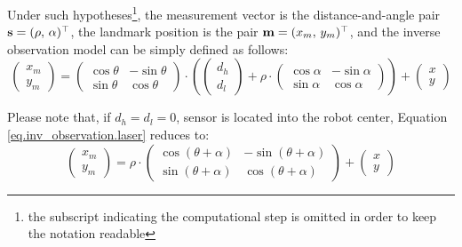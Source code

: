 		Under such hypotheses\footnote{\label{sec.models.subscript}the subscript indicating the computational step is omitted in order to keep the notation readable}, the measurement vector is the distance-and-angle pair $\boldsymbol{\mathrm{{s}}} = (\rho,\, \alpha)^\top$, the landmark position is the pair $\boldsymbol{\mathrm{{m}}} = (x_m,\, y_m)^\top$, and the inverse observation model can be simply defined as follows:
		\begin{equation}
			\label{eq.inv_observation.laser}
			\left(\begin{array}{c}
				x_m \\ y_m
			\end{array}\right)
			=
			\left(\begin{array}{ccc}
				\cos{\theta} & -\sin{\theta} \\
				\sin{\theta} & \cos{\theta}
			\end{array}\right)
			\cdot
			\left(
				\left(\begin{array}{c}
					d_h \\ d_l
				\end{array}\right)
				+ \rho \cdot
				\left(\begin{array}{cc}
					\cos{\alpha} & -\sin{\alpha} \\
					\sin{\alpha} & \cos{\alpha}
				\end{array}\right)
			\right)
			+
			\left(\begin{array}{c}
				x \\ y
			\end{array}\right)
		\end{equation}
		
		Please note that, if $d_h = d_l = 0$, \ie{} sensor is located into the robot center, Equation \ref{eq.inv_observation.laser} reduces to:
		\[
			\left(\begin{array}{c}
				x_m \\ y_m
			\end{array}\right)
			=
			\rho \cdot
			\left(\begin{array}{ccc}
				\cos{(\theta + \alpha)} & -\sin{(\theta + \alpha)} \\
				\sin{(\theta + \alpha)} & \cos{(\theta + \alpha)}
			\end{array}\right)
			+
			\left(\begin{array}{c}
				x \\ y
			\end{array}\right)
		\]
		
